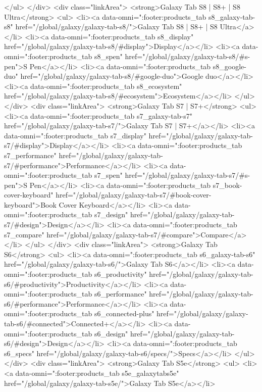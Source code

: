 {{{{{{{{{{{{{{{{{{{{{{{{{{{{{{{{{{{{{{{{{{{{{{{{{{{{{			</ul>
		</div>
		<div class="linkArea">
			<strong>Galaxy Tab S8 | S8+ | S8 Ultra</strong>
			<ul>
				<li><a data-omni=":footer:products_tab s8_galaxy-tab-s8" href="/global/galaxy/galaxy-tab-s8/">Galaxy Tab S8 | S8+ | S8 Ultra</a></li>
				<li><a data-omni=":footer:products_tab s8_display" href="/global/galaxy/galaxy-tab-s8/#display">Display</a></li>
				<li><a data-omni=":footer:products_tab s8_spen" href="/global/galaxy/galaxy-tab-s8/#s-pen">S Pen</a></li>
				<li><a data-omni=":footer:products_tab s8_google-duo" href="/global/galaxy/galaxy-tab-s8/#google-duo">Google duo</a></li>
				<li><a data-omni=":footer:products_tab s8_ecosystem" href="/global/galaxy/galaxy-tab-s8/#ecosystem">Ecosystem</a></li>
			</ul>
		</div>
		<div class="linkArea">
			<strong>Galaxy Tab S7 | S7+</strong>
			<ul>
				<li><a data-omni=":footer:products_tab s7_galaxy-tab-s7" href="/global/galaxy/galaxy-tab-s7/">Galaxy Tab S7 | S7+</a></li>
				<li><a data-omni=":footer:products_tab s7_display" href="/global/galaxy/galaxy-tab-s7/#display">Display</a></li>
				<li><a data-omni=":footer:products_tab s7_performance" href="/global/galaxy/galaxy-tab-s7/#performance">Performance</a></li>
				<li><a data-omni=":footer:products_tab s7_spen" href="/global/galaxy/galaxy-tab-s7/#s-pen">S Pen</a></li>
				<li><a data-omni=":footer:products_tab s7_book-cover-keyboard" href="/global/galaxy/galaxy-tab-s7/#book-cover-keyboard">Book Cover Keyboard</a></li>
				<li><a data-omni=":footer:products_tab s7_design" href="/global/galaxy/galaxy-tab-s7/#design">Design</a></li>
				<li><a data-omni=":footer:products_tab s7_compare" href="/global/galaxy/galaxy-tab-s7/#compare">Compare</a></li>
			</ul>
		</div>
		<div class="linkArea">
			<strong>Galaxy Tab S6</strong>
			<ul>
				<li><a data-omni=":footer:products_tab s6_galaxy-tab-s6" href="/global/galaxy/galaxy-tab-s6/">Galaxy Tab S6</a></li>
				<li><a data-omni=":footer:products_tab s6_productivity" href="/global/galaxy/galaxy-tab-s6/#productivity">Productivity</a></li>
				<li><a data-omni=":footer:products_tab s6_performance" href="/global/galaxy/galaxy-tab-s6/#performance">Performance</a></li>
				<li><a data-omni=":footer:products_tab s6_connected-plus" href="/global/galaxy/galaxy-tab-s6/#connected">Connected+</a></li>
				<li><a data-omni=":footer:products_tab s6_design" href="/global/galaxy/galaxy-tab-s6/#design">Design</a></li>
				<li><a data-omni=":footer:products_tab s6_specs" href="/global/galaxy/galaxy-tab-s6/specs/">Specs</a></li>
			</ul>
		</div>
		<div class="linkArea">
			<strong>Galaxy Tab S5e</strong>
			<ul>
				<li><a data-omni=":footer:products_tab s5e_galaxytabs5e" href="/global/galaxy/galaxy-tab-s5e/">Galaxy Tab S5e</a></li>
}}}}}}}}}}}}}}}}}}}}}}}}}}}}}}}}}}}}}}}}}}}}}}}}}}}}}
